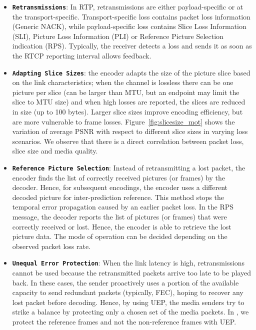 \begin{itemize}
\setlength{\itemsep}{0pt}

  \item \textbf{\texttt{Retransmissions}}: In RTP, retransmissions are either
  payload-specific or at the transport-specific. Transport-specific loss
  contains packet loss information (Generic NACK), while payload-specific loss
  contains Slice Loss Information (SLI), Picture Loss Information (PLI) or
  Reference Picture Selection indication (RPS). Typically, the receiver
  detects a loss and sends it as soon as the RTCP reporting interval allows
  feedback.

  \item \textbf{\texttt{Adapting Slice Sizes}}: the encoder adapts the size of
  the picture slice based on the link characteristics; when the channel is
  lossless there can be one picture per slice (can be larger than MTU, but an
  endpoint may limit the slice to MTU size) and when
  high losses are reported, the slices are reduced in size (up to 100 bytes).
  Larger slice sizes improve encoding efficiency, but are more vulnerable to
  frame losses. Figure~\ref{fig:slicesize_mot} shows the variation of average
  PSNR with respect to different slice sizes in varying loss scenarios. We
  observe that there is a direct correlation between packet loss, slice
  size and media quality.

  \item \textbf{\texttt{Reference Picture Selection}}: Instead of
  retransmitting a lost packet, the encoder finds the list of correctly
  received pictures (or frames) by the decoder. Hence, for subsequent encodings, the
  encoder uses a different decoded picture for inter-prediction reference.
  This method stops the temporal error propagation caused by an earlier packet
  loss. In the RPS message, the decoder reports the list of pictures (or frames)
  that were correctly received or lost. Hence, the encoder is able to retrieve
  the lost picture data. The mode of operation can be decided
  depending on the observed packet loss rate.

  \item \textbf{\texttt{Unequal Error Protection}}: When the link latency is
  high, retransmissions cannot be used because the
  retransmitted packets arrive too late to be played back. In these cases, the
  sender proactively uses a portion of the available capacity to send
  redundant packets (typically, FEC), hoping to recover any lost packet before
  decoding. Hence, by using UEP, the media senders try to strike a balance by
  protecting only a chosen set of the media packets. In , we
  protect the reference frames and not the non-reference frames with UEP.

\end{itemize}

